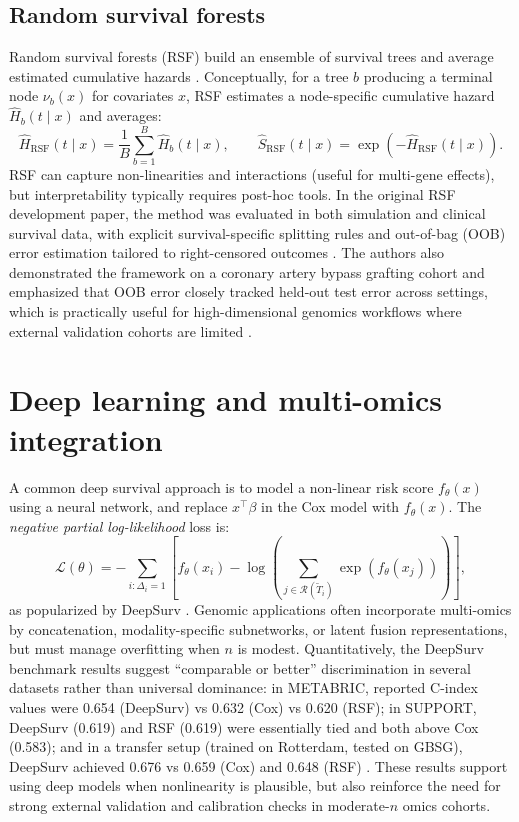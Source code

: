 \documentclass[11pt]{article}
\begin{document}
\subsection{Random survival forests}
Random survival forests (RSF) build an ensemble of survival trees and average estimated cumulative hazards \citep{Ishwaran2008}. Conceptually, for a tree $b$ producing a terminal node $\nu_b(x)$ for covariates $x$, RSF estimates a node-specific cumulative hazard $\hat H_b(t\mid x)$ and averages:
\begin{equation}
\hat H_{\text{RSF}}(t\mid x) = \frac{1}{B}\sum_{b=1}^{B}\hat H_b(t\mid x),
\qquad
\hat S_{\text{RSF}}(t\mid x)=\exp\!\left(-\hat H_{\text{RSF}}(t\mid x)\right).
\label{eq:rsf_chf}
\end{equation}
RSF can capture non-linearities and interactions (useful for multi-gene effects), but interpretability typically requires post-hoc tools.
In the original RSF development paper, the method was evaluated in both simulation and clinical survival data, with explicit survival-specific splitting rules and out-of-bag (OOB) error estimation tailored to right-censored outcomes \citep{Ishwaran2008}. The authors also demonstrated the framework on a coronary artery bypass grafting cohort and emphasized that OOB error closely tracked held-out test error across settings, which is practically useful for high-dimensional genomics workflows where external validation cohorts are limited \citep{Ishwaran2008}.

\section{Deep learning and multi-omics integration}\label{sec:dl}
A common deep survival approach is to model a non-linear risk score $f_\theta(x)$ using a neural network, and replace $x^\top\beta$ in the Cox model with $f_\theta(x)$. The \emph{negative partial log-likelihood} loss is:
\begin{equation}
\mathcal{L}(\theta)
=
-\sum_{i:\Delta_i=1}
\left[
f_\theta(x_i) - \log\!\left(\sum_{j\in \mathcal{R}(\tilde T_i)}\exp(f_\theta(x_j))\right)
\right],
\label{eq:deepcox_loss}
\end{equation}
as popularized by DeepSurv \citep{Katzman2018}. Genomic applications often incorporate multi-omics by concatenation, modality-specific subnetworks, or latent fusion representations, but must manage overfitting when $n$ is modest.
Quantitatively, the DeepSurv benchmark results suggest ``comparable or better'' discrimination in several datasets rather than universal dominance: in METABRIC, reported C-index values were 0.654 (DeepSurv) vs 0.632 (Cox) vs 0.620 (RSF); in SUPPORT, DeepSurv (0.619) and RSF (0.619) were essentially tied and both above Cox (0.583); and in a transfer setup (trained on Rotterdam, tested on GBSG), DeepSurv achieved 0.676 vs 0.659 (Cox) and 0.648 (RSF) \citep{Katzman2018}. These results support using deep models when nonlinearity is plausible, but also reinforce the need for strong external validation and calibration checks in moderate-$n$ omics cohorts.
\end{document}
